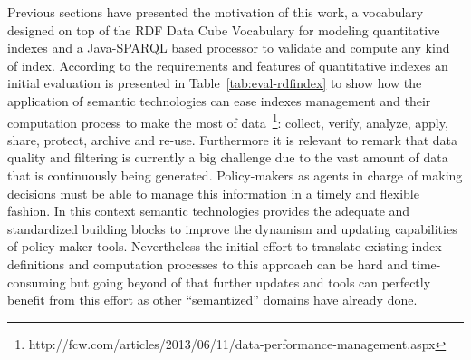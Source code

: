 Previous sections have presented the motivation of this work, a vocabulary designed on top of the 
RDF Data Cube Vocabulary for modeling quantitative indexes and a Java-SPARQL based processor 
to validate and compute any kind of index. According to the requirements and features 
of quantitative indexes an initial evaluation is presented in Table~\ref{tab:eval-rdfindex} to show how the application of semantic technologies can ease indexes management and their computation process 
to make the most of data~\footnote{http://fcw.com/articles/2013/06/11/data-performance-management.aspx}: 
collect, verify, analyze, apply, share, protect, archive and re-use. Furthermore it is relevant to remark that data quality and filtering is 
currently a big challenge due to the vast amount of data that is continuously being generated. Policy-makers as agents in charge 
of making decisions must be able to manage this information in a timely and flexible fashion. In this context semantic technologies provides the adequate and standardized building blocks to improve the dynamism and updating capabilities of policy-maker tools. Nevertheless 
the initial effort to translate existing index definitions and computation processes to this approach can 
be hard and time-consuming but going beyond of that further updates and tools can perfectly benefit from this effort as 
other ``semantized'' domains have already done. 

